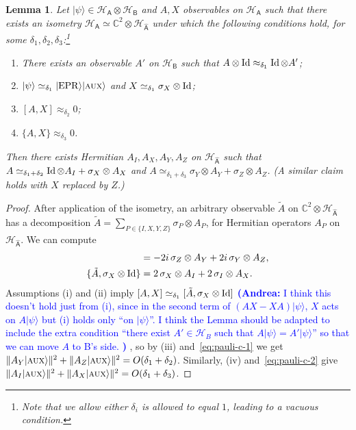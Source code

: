 \documentclass[11pt]{article}
\newtheorem{lemma}[theorem]{Lemma}
\theoremstyle{remark}
\theoremstyle{definition}
\newcommand{\ket}[1]{|#1\rangle}
\newcommand{\Id}{\ensuremath{\mathop{\rm Id}\nolimits}}
\newcommand{\reg}[1]{{\textsf{#1}}}
\newcommand{\C}{\ensuremath{\mathbb{C}}}
\newcommand{\mH}{\mathcal{H}}
\newcommand{\EPR}{{\rm EPR}}
\newcommand{\aux}{\textsc {aux}}
\newcommand{\anote}[1]{\textcolor{blue}{\small {\textbf{(Andrea:} #1 \textbf{) }}}}
\begin{document}
\begin{lemma}\label{lem:pauli-c}
Let $\ket{\psi} \in \mH_{\reg{A}} \otimes \mH_{\reg{B}}$ and $A,X$ observables on $\mH_{\reg{A}}$ such that there exists an isometry $\mH_{\reg{A}} \simeq \C^2 \otimes \mH_{\hat{\reg{A}}}$ under which the following conditions hold, for some $\delta_1,\delta_2,\delta_3$:\footnote{Note that we allow either $\delta_i$ is allowed to equal $1$, leading to a vacuous condition.}
\begin{enumerate}
\item[(i)] There exists an observable $A'$ on $\mH_\reg{B}$ such that $A\otimes \Id \approx_{\delta_1} \Id \otimes A'$;
\item[(ii)] $\ket{\psi} \simeq_{\delta_1} \ket{\EPR}\ket{\aux}$ and $X\simeq_{\delta_1} \sigma_X \otimes \Id$; 
\item[(iii)] $[A,X]\approx_{\delta_2} 0$;
\item[(iv)] $\{A,X\} \approx_{\delta_3} 0$.
\end{enumerate}
Then there exists Hermitian $A_I,A_X,A_Y,A_Z$ on $\mH_{\hat{\reg{A}}}$ such that $A \simeq_{\delta_1+\delta_2} \Id \otimes A_I + \sigma_X \otimes A_X$ and $A \simeq_{\delta_1 + \delta_3} \sigma_Y \otimes A_Y + \sigma_Z \otimes A_Z$. (A similar claim holds with $X$ replaced by $Z$.)
\end{lemma}

\begin{proof}
After application of the isometry, an arbitrary observable $\tilde{A}$ on  $\C^2 \otimes \mH_{\hat{\reg{A}}}$ has a decomposition $\tilde{A} = \sum_{P\in\{I,X,Y,Z\}} \sigma_P \otimes A_P$, for Hermitian operators $A_P$ on $\mH_{\hat{\reg{A}}}$. We can compute
\begin{align}
[\tilde{A},\sigma_X\otimes \Id] &= -2i\,\sigma_Z \otimes A_Y + 2i\,\sigma_Y \otimes A_Z,\label{eq:pauli-c-1}\\
\{\tilde{A},\sigma_X\otimes \Id\} &= 2\,\sigma_X \otimes A_I + 2 \,\sigma_I \otimes A_X.\label{eq:pauli-c-2}
\end{align} 
Assumptions (i) and (ii) imply $[A,X] \simeq_{\delta_1} [\tilde{A},\sigma_X \otimes \Id]$ \anote{I think this doesn't hold just from (i), since in the second term of $(AX - XA) \ket{\psi}$, $X$ acts on $A\ket{\psi}$ but (i) holds only ``on $\ket{\psi}$''. I think the Lemma should be adapted to include the extra condition ``there exist $A' \in \mathcal{H}_B$ such that $A\ket{\psi} = A'\ket{\psi}$'' so that we can move $A$ to B's side.}, so by (iii) and~\eqref{eq:pauli-c-1} we get $\| A_Y \ket{\aux}\|^2 + \|A_Z \ket{\aux}\|^2 = O(\delta_1+\delta_2)$. Similarly, (iv) and~\eqref{eq:pauli-c-2} give $\| A_I \ket{\aux}\|^2 + \|A_X \ket{\aux}\|^2 = O(\delta_1+\delta_3)$.
\end{proof}
\end{document}
